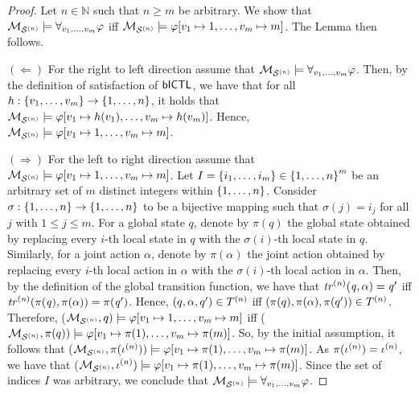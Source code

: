 \documentclass{article}
\begin{document}
\begin{proof}
Let $n \in \mathbb N$ such that $n \geq m$ be arbitrary. We show that $\mathcal{M}_{\mathcal{S}^{(n)}}
\models \forall_{v_1,\ldots,v_m} \varphi$ iff $\mathcal{M}_{\mathcal{S}^{(n)}} \models \varphi[v_1 \mapsto 1, \ldots, v_m
\mapsto m]$. The Lemma then follows.

$\boldsymbol{(\Longleftarrow)}$ For the right to left direction assume that
    $\mathcal{M}_{\mathcal{S}^{(n)}} \models \forall_{v_1,\ldots,v_m} \varphi$. Then, by the definition of satisfaction of
    $\sf{bICTL}$, we have that for all $h: \left \{ v_1, \ldots, v_m \right \} \rightarrow
    \left \{ 1,\ldots,n \right \}$,  it holds that $\mathcal{M}_{\mathcal{S}^{(n)}} \models \varphi[v_1 \mapsto
    h(v_1), \ldots, v_m \mapsto h(v_m)]$.  Hence, $\mathcal{M}_{\mathcal{S}^{(n)}} \models \varphi[v_1
    \mapsto 1, \ldots, v_m \mapsto m]$.


$\boldsymbol{(\Longrightarrow)}$ For the left to right direction assume that
    $\mathcal{M}_{\mathcal{S}^{(n)}} \models \varphi[v_1 \mapsto 1, \ldots, v_m \mapsto m]$. Let $I =
    \left \{ i_1, \ldots, i_m \right \} \in \left \{ 1, \ldots, n \right \}^m$ be an arbitrary set of $m$
    distinct integers within $\left \{ 1,\ldots,n \right \}$.  Consider $\sigma : \left \{ 1,
    \ldots, n \right \} \rightarrow \left \{ 1, \ldots, n \right \}$ to be a bijective mapping such
    that $\sigma(j) = i_j$ for all $j$ with $1 \leq j \leq m$. For a global
    state $q$, denote by $\pi(q)$ the global state obtained by replacing every
    $i$-th local state in $q$ with the $\sigma(i)$-th local state in $q$.
    Similarly, for a joint action $\alpha$, denote by $\pi(\alpha)$ the joint
    action obtained by replacing every $i$-th local action in $\alpha$ with the
    $\sigma(i)$-th local action in $\alpha$. Then, by the definition of the
    global transition function, we have that $\it{tr}^{(n)}(q, \alpha) = q'$  iff
    $\it{tr}^{(n)}(\pi(q), \pi(\alpha)) = \pi(q')$.  Hence,  $(q, \alpha, q') \in
    T^{(n)}$ iff $(\pi(q), \pi(\alpha), \pi(q')) \in T^{(n)}$.
    Therefore, ($\mathcal{M}_{\mathcal{S}^{(n)}}, q) \models  \varphi[v_1 \mapsto 1, \ldots, v_m
    \mapsto m]$ iff ($\mathcal{M}_{\mathcal{S}^{(n)}}, \pi(q)) \models  \varphi[v_1 \mapsto \pi(1),
    \ldots, v_m \mapsto \pi(m)]$. So, by the initial assumption,  it follows
    that ($\mathcal{M}_{\mathcal{S}^{(n)}}, \pi(\iota^{({n})})) \models  \varphi[v_1 \mapsto \pi(1),
    \ldots, v_m \mapsto \pi(m)]$. As $\pi(\iota^{({n})}) = \iota^{({n})}$, we
    have that ($\mathcal{M}_{\mathcal{S}^{(n)}}, \iota^{({n})}) \models  \varphi[v_1 \mapsto \pi(1),
\ldots, v_m \mapsto \pi(m)]$. Since the set of indices $I$ was arbitrary, we
conclude that $\mathcal{M}_{\mathcal{S}^{(n)}} \models \forall_{v_1,\ldots,v_m} \varphi$.  \end{proof}
\end{document}
